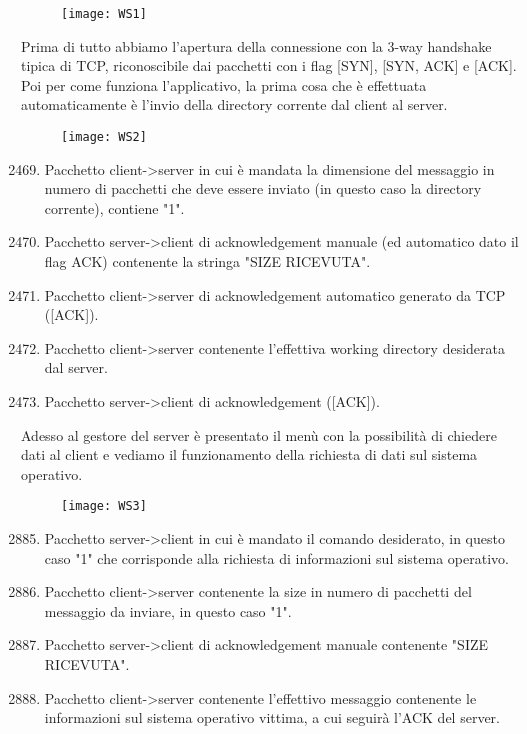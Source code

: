 \documentclass[a4paper]{report}
\begin{document}
\begin{figure}[hp]
	\centerline{\texttt{[image: WS1]}}
\end{figure}

Prima di tutto abbiamo l'apertura della connessione con la 3-way handshake tipica di TCP, riconoscibile dai pacchetti con i flag [SYN], [SYN, ACK] e [ACK].
\\Poi per come funziona l'applicativo, la prima cosa che è effettuata automaticamente è l'invio della directory corrente dal client al server.

\begin{figure}[hp]
	\centerline{\texttt{[image: WS2]}}
\end{figure}
\begin{enumerate}
	\setcounter{enumi}{2468}
	\item Pacchetto client->server in cui è mandata la dimensione del messaggio in numero di pacchetti che deve essere inviato (in questo caso la directory corrente), contiene "1".
	\item Pacchetto server->client di acknowledgement manuale (ed automatico dato il flag ACK) contenente la stringa "SIZE RICEVUTA".
	\item Pacchetto client->server di acknowledgement automatico generato da TCP ([ACK]).
	\item Pacchetto client->server contenente l'effettiva working directory desiderata dal server.
	\item Pacchetto server->client di acknowledgement ([ACK]).
\end{enumerate}
Adesso al gestore del server è presentato il menù con la possibilità di chiedere dati al client e vediamo il funzionamento della richiesta di dati sul sistema operativo.
\begin{figure}[ht!]
	\centerline{\texttt{[image: WS3]}}
\end{figure}

\begin{enumerate}
	\setcounter{enumi}{2884}
	\item Pacchetto server->client in cui è mandato il comando desiderato, in questo caso "1" che corrisponde alla richiesta di informazioni sul sistema operativo.
	\item Pacchetto client->server contenente la size in numero di pacchetti del messaggio da inviare, in questo caso "1".
	\item Pacchetto server->client di acknowledgement manuale contenente "SIZE RICEVUTA".
	\item Pacchetto client->server contenente l'effettivo messaggio contenente le informazioni sul sistema operativo vittima, a cui seguirà l'ACK del server.
\end{enumerate}
\end{document}
